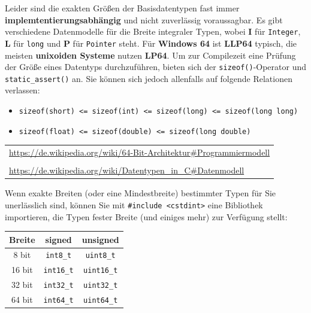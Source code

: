 \documentclass[a4paper]{report}
\begin{document}
Leider sind die exakten Größen der Basisdatentypen fast immer \textbf{implemtentierungsabhängig} und nicht zuverlässig voraussagbar. Es gibt verschiedene Datenmodelle für die Breite integraler Typen, wobei \textbf{I} für \texttt{Integer}, \textbf{L} für \texttt{long} und \textbf{P} für \texttt{Pointer} steht. Für \textbf{Windows 64} ist \textbf{LLP64} typisch, die meisten \textbf{unixoiden Systeme} nutzen \textbf{LP64}. Um zur Compilezeit eine Prüfung der Größe eines Datentyps durchzuführen, bieten sich der \texttt{sizeof()}-Operator und \texttt{static\_assert()} an. Sie können sich jedoch allenfalls auf folgende Relationen verlassen:


\begin{itemize}
	\item \texttt{sizeof(short) \quad <= \quad sizeof(int) \quad <= \quad sizeof(long) \quad <= \quad sizeof(long long)}
	\item \texttt{sizeof(float) \quad <= \quad sizeof(double) \quad <= \quad sizeof(long double)}
\end{itemize}

\begin{center}
\begin{tabular}{l}
	\url{https://de.wikipedia.org/wiki/64-Bit-Architektur#Programmiermodell} \\ \\
	\url{https://de.wikipedia.org/wiki/Datentypen_in_C#Datenmodell}
\end{tabular}
\end{center}

\begin{multicols}{2}
Wenn exakte Breiten (oder eine Mindestbreite) bestimmter Typen für Sie unerlässlich sind, können Sie mit \texttt{\#include <cstdint>} eine Bibliothek importieren, die Typen fester Breite (und einiges mehr) zur Verfügung stellt:

\begin{center}
\begin{tabular}{|c||cc|}
	\hline
	\textbf{Breite} & \textbf{signed} & \textbf{unsigned} \\ \hline
	8 bit & \texttt{int8\_t} & \texttt{uint8\_t} \\
	16 bit & \texttt{int16\_t} & \texttt{uint16\_t} \\
	32 bit & \texttt{int32\_t} & \texttt{uint32\_t} \\
	64 bit & \texttt{int64\_t} & \texttt{uint64\_t} \\
	\hline
	
\end{tabular}
\end{center}
\end{multicols}
\end{document}
